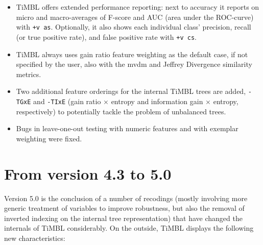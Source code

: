 \documentclass{report}
\begin{document}
\begin{itemize}

\item TiMBL offers extended performance reporting: next to accuracy it
  reports on micro and macro-averages of F-score and AUC (area under
  the ROC-curve) with {\tt +v as}. Optionally, it also shows each
  individual class' precision, recall (or true positive rate), and
  false positive rate with {\tt +v cs}.

\item TiMBL always uses gain ratio feature weighting as the default
  case, if not specified by the user, also with the {\sc mvdm} and
  Jeffrey Divergence similarity metrics.

\item Two additional feature orderings for the internal TiMBL trees
  are added, {\tt -TGxE} and {\tt -TIxE} (gain ratio $\times$ entropy
  and information gain $\times$ entropy, respectively) to potentially
  tackle the problem of unbalanced trees.

\item Bugs in leave-one-out testing with numeric features and with
  exemplar weighting were fixed.

\end{itemize}

\section{From version 4.3 to 5.0}

Version 5.0 is the conclusion of a number of recodings (mostly
involving more generic treatment of variables to improve robustness,
but also the removal of inverted indexing on the internal tree
representation) that have changed the internals of TiMBL
considerably. On the outside, TiMBL displays the following new
characteristics:
\end{document}
